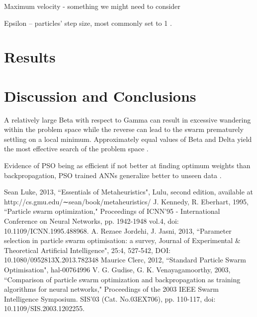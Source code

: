 \documentclass[12pt]{article}
\begin{document}
Maximum velocity - something we might need to consider 

Epsilon – particles' step size, most commonly set to 1 \cite{Luke}.


\vspace{-1.5em}
\section{Results}



\vspace{-1.5em}
\section{Discussion and Conclusions}
\vspace{-1.5em}

A relatively large Beta with respect to Gamma can result in excessive wandering within the problem space while the reverse  can lead to the swarm prematurely settling on a local minimum. Approximately equal values of Beta and Delta yield the most effective search of the problem space \cite{Kennedy}.

Evidence of PSO being as efficient if not better at finding optimum weights than backpropagation, PSO trained ANNs generalize better to unseen data \cite{Kennedy}.


\vspace{-1.5em}
\begin{thebibliography}{10}
 Sean Luke, 2013, ``Essentials of Metaheuristics", Lulu, second edition, available at http://cs.gmu.edu/∼sean/book/metaheuristics/
 J. Kennedy, R. Eberhart, 1995, ``Particle swarm optimization," Proceedings of ICNN'95 - International Conference on Neural Networks,  pp. 1942-1948 vol.4, doi: 10.1109/ICNN.1995.488968.
 A. Rezaee Jordehi, J. Jasni, 2013, ``Parameter selection in particle swarm optimisation: a survey, Journal of Experimental & Theoretical Artificial Intelligence", 25:4, 527-542, DOI: 10.1080/0952813X.2013.782348
 Maurice Clerc, 2012, ``Standard Particle Swarm Optimisation", hal-00764996
  V. G. Gudise, G. K. Venayagamoorthy, 2003, ``Comparison of particle swarm optimization and backpropagation as training algorithms for neural networks," Proceedings of the 2003 IEEE Swarm Intelligence Symposium. SIS'03 (Cat. No.03EX706), pp. 110-117, doi: 10.1109/SIS.2003.1202255.


\end{thebibliography}
\end{document}

